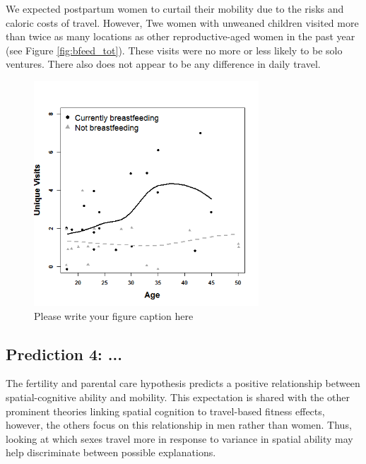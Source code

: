 We expected postpartum women to curtail their mobility due to the risks and caloric costs of travel.  However, Twe women with unweaned children visited more than twice as many locations as other reproductive-aged women in the past year (see Figure \ref{fig:bfeed_tot}).  These visits were no more or less likely to be solo ventures.  There also does not appear to be any difference in daily travel. 		

\begin{figure}[!htb]
  \includegraphics[width=0.75\textwidth]{bfeed_tot}
\caption{Please write your figure caption here}
\label{fig:1}       %
\end{figure}

	\subsection{Prediction 4: ... }
	\label{sec:3.1}
The fertility and parental care hypothesis predicts a positive relationship between spatial-cognitive ability and mobility. This expectation is shared with the other prominent theories linking spatial cognition to travel-based fitness effects, however, the others focus on this relationship in men rather than women.  Thus, looking at which sexes travel more in response to variance in spatial ability may help discriminate between possible explanations.	

